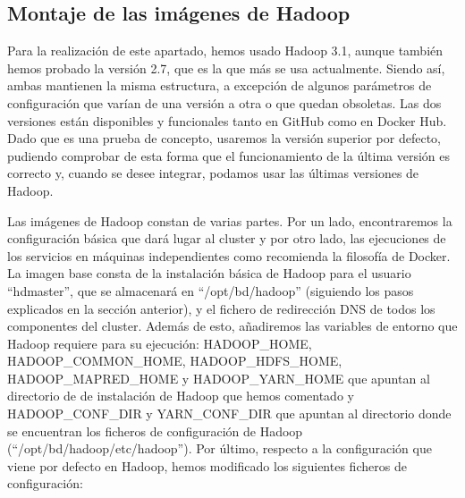 \subsection {Montaje de las imágenes de Hadoop\label{montHadoop}}
Para la realización de este apartado, hemos usado Hadoop 3.1, aunque también hemos probado la versión 2.7, que es la que más se usa actualmente. Siendo así, ambas mantienen la misma estructura, a excepción de algunos parámetros de configuración que varían de una versión a otra o que quedan obsoletas. Las dos versiones están disponibles y funcionales tanto en GitHub como en Docker Hub. Dado que es una prueba de concepto, usaremos la versión superior por defecto, pudiendo comprobar de esta forma que el funcionamiento de la última versión es correcto y, cuando se desee integrar, podamos usar las últimas versiones de Hadoop.

Las imágenes de Hadoop constan de varias partes. Por un lado, encontraremos la configuración básica que dará lugar al cluster y por otro lado, las ejecuciones de los servicios en máquinas independientes como recomienda la filosofía de Docker. La imagen base consta de la instalación básica de Hadoop para el usuario “hdmaster”, que se almacenará en “/opt/bd/hadoop” (siguiendo los pasos explicados en la sección anterior), y el fichero de redirección DNS de todos los componentes del cluster. Además de esto, añadiremos las variables de entorno que Hadoop requiere para su ejecución: HADOOP\_HOME, HADOOP\_COMMON\_HOME, HADOOP\_HDFS\_HOME, HADOOP\_MAPRED\_HOME y HADOOP\_YARN\_HOME que apuntan al directorio de de instalación de Hadoop que hemos comentado y HADOOP\_CONF\_DIR y YARN\_CONF\_DIR que apuntan al directorio donde se encuentran los ficheros de configuración de Hadoop (“/opt/bd/hadoop/etc/hadoop”). Por último, respecto a la configuración que viene por defecto en Hadoop, hemos modificado los siguientes ficheros de configuración:

